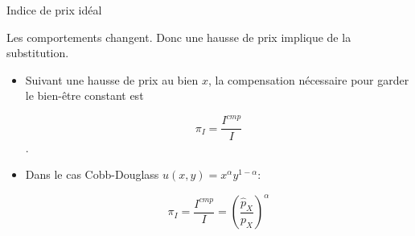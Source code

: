 \documentclass[handout]{beamer}
\begin{document}
\begin{frame}{Indice de prix idéal}

Les comportements changent. Donc une hausse de prix implique de la substitution. 

\begin{itemize}
\item Suivant une hausse de prix au bien $x$, la compensation nécessaire pour garder le bien-être constant est 

$$ \pi_I =  \frac{I^{cmp}}{I} $$.

\item Dans le cas Cobb-Douglass $u(x,y)=x^{\alpha}y^{1-\alpha}$: 

$$ \pi_I = \frac{I^{cmp}}{I} = \left(\frac{\hat p_X}{p_X}\right)^\alpha$$

\end{itemize}

\end{frame}
\end{document}
